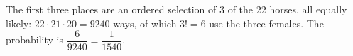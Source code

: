 The first three places are an ordered selection of $3$ of the $22$ horses, all equally likely: $22\cdot21\cdot20=9240$ ways, of which $3!=6$ use the three females. The probability is $\dfrac{6}{9240}=\boxed{\dfrac{1}{1540}}$.
